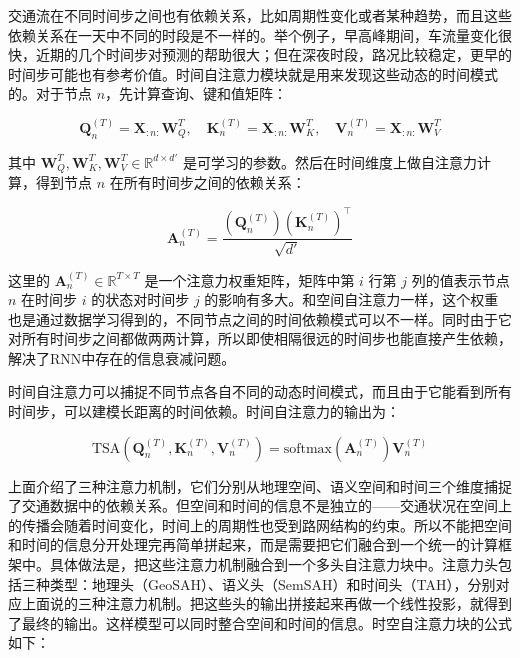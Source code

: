 交通流在不同时间步之间也有依赖关系，比如周期性变化或者某种趋势，而且这些依赖关系在一天中不同的时段是不一样的。举个例子，早高峰期间，车流量变化很快，近期的几个时间步对预测的帮助很大；但在深夜时段，路况比较稳定，更早的时间步可能也有参考价值。时间自注意力模块就是用来发现这些动态的时间模式的。对于节点 $n$，先计算查询、键和值矩阵：

\begin{equation}
\boldsymbol{Q}_n^{(T)} = \boldsymbol{X}_{:n:} \boldsymbol{W}_Q^T, \quad
\boldsymbol{K}_n^{(T)} = \boldsymbol{X}_{:n:} \boldsymbol{W}_K^T, \quad
\boldsymbol{V}_n^{(T)} = \boldsymbol{X}_{:n:} \boldsymbol{W}_V^T
\end{equation}

其中 $\boldsymbol{W}_Q^T, \boldsymbol{W}_K^T, \boldsymbol{W}_V^T \in \mathbb{R}^{d \times d'}$ 是可学习的参数。然后在时间维度上做自注意力计算，得到节点 $n$ 在所有时间步之间的依赖关系：

\begin{equation}
\boldsymbol{A}_n^{(T)} = \frac{(\boldsymbol{Q}_n^{(T)})(\boldsymbol{K}_n^{(T)})^\top}{\sqrt{d'}}
\end{equation}

这里的 $\boldsymbol{A}_n^{(T)} \in \mathbb{R}^{T \times T}$ 是一个注意力权重矩阵，矩阵中第 $i$ 行第 $j$ 列的值表示节点 $n$ 在时间步 $i$ 的状态对时间步 $j$ 的影响有多大。和空间自注意力一样，这个权重也是通过数据学习得到的，不同节点之间的时间依赖模式可以不一样。同时由于它对所有时间步之间都做两两计算，所以即使相隔很远的时间步也能直接产生依赖，解决了RNN中存在的信息衰减问题。

时间自注意力可以捕捉不同节点各自不同的动态时间模式，而且由于它能看到所有时间步，可以建模长距离的时间依赖。时间自注意力的输出为：

\begin{equation}
\text{TSA}(\boldsymbol{Q}_n^{(T)}, \boldsymbol{K}_n^{(T)}, \boldsymbol{V}_n^{(T)}) = \text{softmax}(\boldsymbol{A}_n^{(T)}) \boldsymbol{V}_n^{(T)}
\end{equation}

上面介绍了三种注意力机制，它们分别从地理空间、语义空间和时间三个维度捕捉了交通数据中的依赖关系。但空间和时间的信息不是独立的——交通状况在空间上的传播会随着时间变化，时间上的周期性也受到路网结构的约束。所以不能把空间和时间的信息分开处理完再简单拼起来，而是需要把它们融合到一个统一的计算框架中。具体做法是，把这些注意力机制融合到一个多头自注意力块中。注意力头包括三种类型：地理头（GeoSAH）、语义头（SemSAH）和时间头（TAH），分别对应上面说的三种注意力机制。把这些头的输出拼接起来再做一个线性投影，就得到了最终的输出。这样模型可以同时整合空间和时间的信息。时空自注意力块的公式如下：

